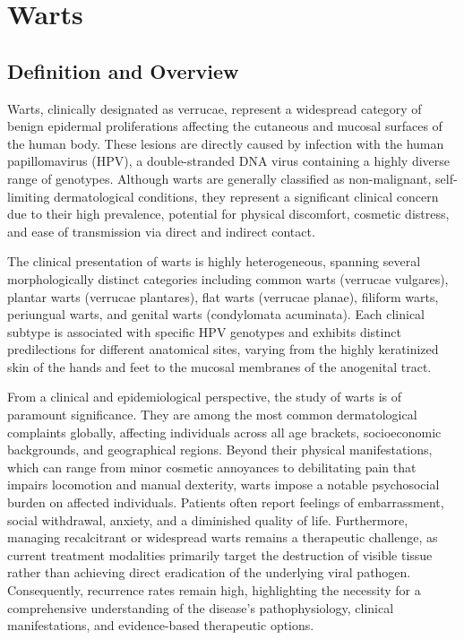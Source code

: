 \chapter{Warts}

\section*{Definition and Overview}
Warts, clinically designated as verrucae, represent a widespread category of benign epidermal proliferations affecting the cutaneous and mucosal surfaces of the human body. These lesions are directly caused by infection with the human papillomavirus (HPV), a double-stranded DNA virus containing a highly diverse range of genotypes. Although warts are generally classified as non-malignant, self-limiting dermatological conditions, they represent a significant clinical concern due to their high prevalence, potential for physical discomfort, cosmetic distress, and ease of transmission via direct and indirect contact.

The clinical presentation of warts is highly heterogeneous, spanning several morphologically distinct categories including common warts (verrucae vulgares), plantar warts (verrucae plantares), flat warts (verrucae planae), filiform warts, periungual warts, and genital warts (condylomata acuminata). Each clinical subtype is associated with specific HPV genotypes and exhibits distinct predilections for different anatomical sites, varying from the highly keratinized skin of the hands and feet to the mucosal membranes of the anogenital tract.

From a clinical and epidemiological perspective, the study of warts is of paramount significance. They are among the most common dermatological complaints globally, affecting individuals across all age brackets, socioeconomic backgrounds, and geographical regions. Beyond their physical manifestations, which can range from minor cosmetic annoyances to debilitating pain that impairs locomotion and manual dexterity, warts impose a notable psychosocial burden on affected individuals. Patients often report feelings of embarrassment, social withdrawal, anxiety, and a diminished quality of life. Furthermore, managing recalcitrant or widespread warts remains a therapeutic challenge, as current treatment modalities primarily target the destruction of visible tissue rather than achieving direct eradication of the underlying viral pathogen. Consequently, recurrence rates remain high, highlighting the necessity for a comprehensive understanding of the disease's pathophysiology, clinical manifestations, and evidence-based therapeutic options.

